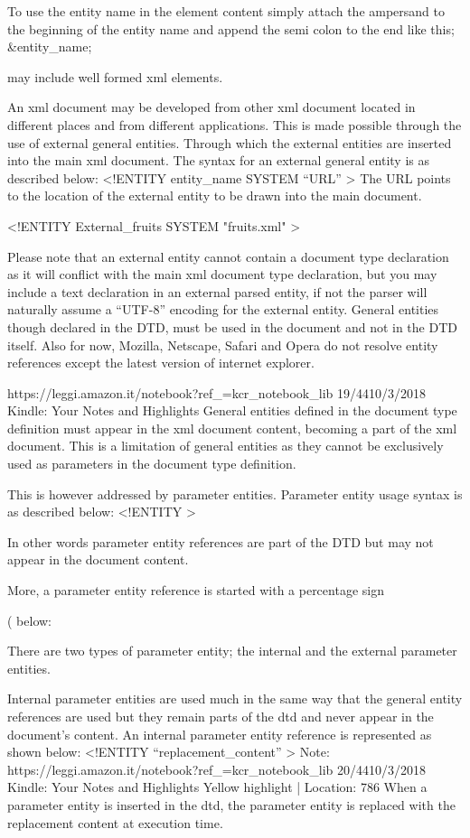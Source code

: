 To use the entity name in the element content simply attach the ampersand to
the beginning of the entity name and append the semi colon to the end like
this; &entity_name;


may include well formed xml elements.


An xml document may be developed from other xml document located in
different places and from different applications. This is made possible through
the use of external general entities. Through which the external entities are
inserted into the main xml document. The syntax for an external general entity
is as described below: <!ENTITY entity_name SYSTEM “URL” > The URL
points to the location of the external entity to be drawn into the main
document.


<!ENTITY External_fruits SYSTEM "fruits.xml" >


Please note that an external entity cannot contain a document type declaration
as it will conflict with the main xml document type declaration, but you may
include a text declaration in an external parsed entity, if not the parser will
naturally assume a “UTF-8” encoding for the external entity. General entities
though declared in the DTD, must be used in the document and not in the
DTD itself. Also for now, Mozilla, Netscape, Safari and Opera do not resolve
entity references except the latest version of internet explorer.


https://leggi.amazon.it/notebook?ref_=kcr_notebook_lib
19/4410/3/2018
Kindle: Your Notes and Highlights
General entities defined in the document type definition must appear in the xml
document content, becoming a part of the xml document. This is a limitation of
general entities as they cannot be exclusively used as parameters in the
document type definition.


This is however addressed by parameter entities. Parameter entity usage
syntax is as described below: <!ENTITY %
>


In other words parameter entity references are part of the DTD but may not
appear in the document content.


More, a parameter entity reference is started with a percentage sign


(%
below: %


There are two types of parameter entity; the internal and the external
parameter entities.


Internal parameter entities are used much in the same way that the general
entity references are used but they remain parts of the dtd and never appear
in the document’s content. An internal parameter entity reference is
represented as shown below: <!ENTITY %
“replacement_content” >
Note:
https://leggi.amazon.it/notebook?ref_=kcr_notebook_lib
20/4410/3/2018
Kindle: Your Notes and Highlights
Yellow highlight | Location: 786
When a parameter entity is inserted in the dtd, the parameter entity is replaced
with the replacement content at execution time.


